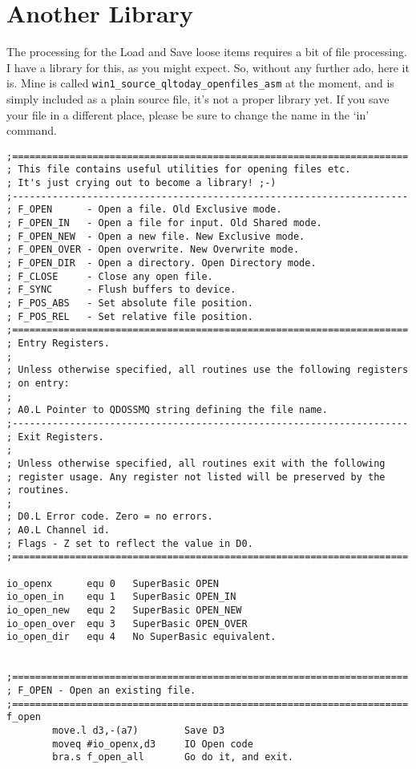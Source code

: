 \section{Another Library}
\label{ch33-another-library}%

The processing for the Load and Save loose items requires a bit
    of file processing. I have a library for this, as you might expect. So,
    without any further ado, here it is. Mine is called
 \nolinkurl{win1_source_qltoday_openfiles_asm} at the moment, and
    is simply included as a plain source file, it's not a proper library yet.
    If you save your file in a different place, please be sure to change the
    name in the `in' command.

\begin{lstlisting}[firstnumber=1,]
;=====================================================================
; This file contains useful utilities for opening files etc.
; It's just crying out to become a library! ;-)
;---------------------------------------------------------------------
; F_OPEN      - Open a file. Old Exclusive mode.
; F_OPEN_IN   - Open a file for input. Old Shared mode.
; F_OPEN_NEW  - Open a new file. New Exclusive mode.
; F_OPEN_OVER - Open overwrite. New Overwrite mode.
; F_OPEN_DIR  - Open a directory. Open Directory mode.
; F_CLOSE     - Close any open file.
; F_SYNC      - Flush buffers to device.
; F_POS_ABS   - Set absolute file position.
; F_POS_REL   - Set relative file position.
;=====================================================================
; Entry Registers.
;
; Unless otherwise specified, all routines use the following registers
; on entry:
;
; A0.L Pointer to QDOSSMQ string defining the file name.
;---------------------------------------------------------------------
; Exit Registers.
;
; Unless otherwise specified, all routines exit with the following
; register usage. Any register not listed will be preserved by the
; routines.
;
; D0.L Error code. Zero = no errors.
; A0.L Channel id.
; Flags - Z set to reflect the value in D0.
;=====================================================================

io_openx      equ 0   SuperBasic OPEN
io_open_in    equ 1   SuperBasic OPEN_IN
io_open_new   equ 2   SuperBasic OPEN_NEW
io_open_over  equ 3   SuperBasic OPEN_OVER
io_open_dir   equ 4   No SuperBasic equivalent.


;=====================================================================
; F_OPEN - Open an existing file.
;=====================================================================
f_open
        move.l d3,-(a7)        Save D3
        moveq #io_openx,d3     IO Open code
        bra.s f_open_all       Go do it, and exit.



\end{lstlisting}
